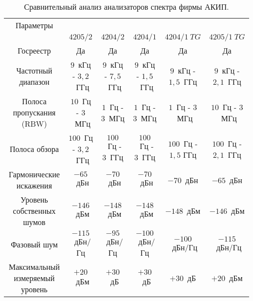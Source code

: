 \begin{table} [p]%
	\caption{Сравнительный анализ анализаторов спектра фирмы АКИП.}%
	\label{tbl:test3}%
	\begin{SingleSpace}
		\setlength\extrarowheight{6pt} %
		\setlength{\tymin}{1.9cm}%
		\begin{tabulary}{\textwidth}{@{}>{\zz}C >{\zz}C >{\zz}C >{\zz}C >{\zz}C >{\zz}C @{}}%
			\toprule     %
			Параметры & 
			
			  \\
			
			&
			$4205/2$ &
			$4204/2$ &
			$4204/1$ &
			$4204/1~TG$ &
			$4205/1~TG$ \\
			
			\midrule %
			
			Госреестр &
			Да &
			Да &
			Да &
			Да &
			Да \\
			
			Частотный диапазон &
			$9$~кГц - $3,2$~ГГц & 
			$9$~кГц - $7,5$~ГГц &
			$9$~кГц - $1,5$~ГГц &
			$9$~кГц - $1,5$~ГГц &
			$9$~кГц - $2,1$~ГГц \\
			
			Полоса пропускания (RBW) &
			$10$~Гц - $3$~МГц &
			$1$~Гц - $3$~МГц &
			$1$~Гц - $3$~МГц &
			$1$~Гц - $3$~МГц &
			$10$~Гц - $3$~МГц \\
			
			Полоса обзора &	
			$100$~Гц - $3,2$~ГГц &
			$100$~Гц - $3$~ГГц &
			$100$~Гц - $3$~ГГц &
			$100$~Гц - $1,5$ ГГц &
			$100$~Гц - $2,1$~ГГц \\
			
			Гармонические искажения &
			$-65$~дБн &
			$-70$~дБн &
			$-70$~дБн &
			$-70$~дБн &
			$-65$~дБн \\
			
			Уровень собственных шумов &
			$-146$~дБм &
			$-148$~дБм &
			$-148$~дБм &
			$-148$~дБм &
			$-146$~дБм \\
			
			Фазовый шум &
			$-115$~дБн/Гц &
			$-95$~дБн/Гц &
			$-100$~дБн/Гц &
			$-100$~дБн/Гц &
			$-115$~дБн/Гц \\
			
			Максимальный измеряемый уровень &	$+20$~дБм &
			$+30$~дБ &
			$+30$~дБ &
			$+30$~дБ &
			$+20$~дБм \\
			
			
			\bottomrule %
		\end{tabulary}%
	\end{SingleSpace}
\end{table}

